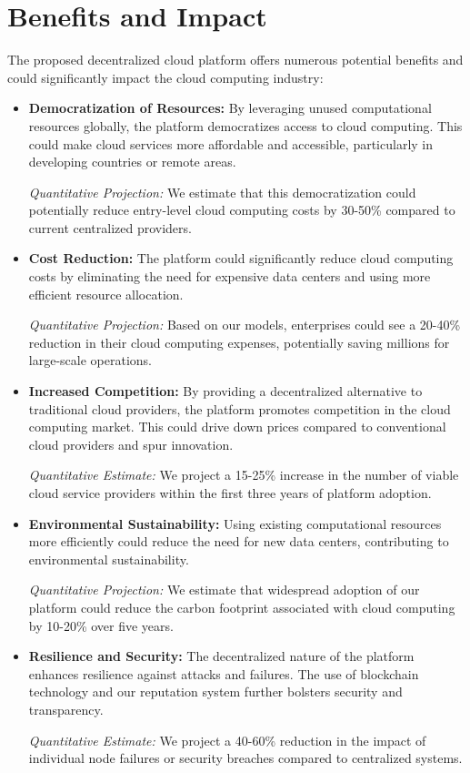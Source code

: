 \section{Benefits and Impact}
\label{sec:benefits_and_impact}

The proposed decentralized cloud platform offers numerous potential benefits and could significantly impact the cloud computing industry:

\begin{itemize}
    \item \textbf{Democratization of Resources:} By leveraging unused computational resources globally, the platform democratizes access to cloud computing. This could make cloud services more affordable and accessible, particularly in developing countries or remote areas.

    \textit{Quantitative Projection:} We estimate that this democratization could potentially reduce entry-level cloud computing costs by 30-50\% compared to current centralized providers.

    \item \textbf{Cost Reduction:} The platform could significantly reduce cloud computing costs by eliminating the need for expensive data centers and using more efficient resource allocation.

    \textit{Quantitative Projection:} Based on our models, enterprises could see a 20-40\% reduction in their cloud computing expenses, potentially saving millions for large-scale operations.

    \item \textbf{Increased Competition:} By providing a decentralized alternative to traditional cloud providers, the platform promotes competition in the cloud computing market. This could drive down prices compared to conventional cloud providers and spur innovation.

    \textit{Quantitative Estimate:} We project a 15-25\% increase in the number of viable cloud service providers within the first three years of platform adoption.

    \item \textbf{Environmental Sustainability:} Using existing computational resources more efficiently could reduce the need for new data centers, contributing to environmental sustainability.

    \textit{Quantitative Projection:} We estimate that widespread adoption of our platform could reduce the carbon footprint associated with cloud computing by 10-20\% over five years.

    \item \textbf{Resilience and Security:} The decentralized nature of the platform enhances resilience against attacks and failures. The use of blockchain technology and our reputation system further bolsters security and transparency.

    \textit{Quantitative Estimate:} We project a 40-60\% reduction in the impact of individual node failures or security breaches compared to centralized systems.
\end{itemize}

